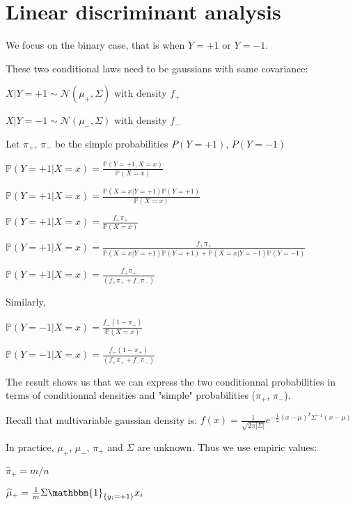 \section*{Linear discriminant analysis}

\vspace{5mm}

We focus on the binary case, that is when $Y=+1$ or $Y=-1$.

These two conditional laws need to be gaussians with same covariance: \vspace{1mm}

$X | Y=+1 \sim \mathcal{N}(\mu_+,\Sigma)$ with density $f_+$

$X | Y=-1 \sim \mathcal{N}(\mu_-,\Sigma)$ with density $f_-$

Let $\pi_+$, $\pi_-$ be the simple probabilities $P(Y=+1)$, $P(Y=-1)$\vspace{3mm}

$ \mathbb{P}(Y=+1|X=x) = \frac{\mathbb{P}(Y=+1, X=x)}{\mathbb{P}(X=x)}$

$ \mathbb{P}(Y=+1|X=x) = \frac{\mathbb{P}(X=x|Y=+1) \mathbb{P}(Y=+1) }{\mathbb{P}(X=x) }$

$ \mathbb{P}(Y=+1|X=x) = \frac{f_+ \pi_+}{\mathbb{P}(X=x) }$

$ \mathbb{P}(Y=+1|X=x) = \frac{f_+ \pi_+}{\mathbb{P}(X=x|Y=+1)\mathbb{P}(Y= +1) + \mathbb{P}(X=x|Y=-1)\mathbb{P}(Y= -1) }$

$\mathbb{P}(Y=+1|X=x) = \frac{f_+ \pi_+}{(f_+\pi_+ + f_-\pi_-)}$

Similarly,

$ \mathbb{P}(Y=-1|X=x) = \frac{f_- (1-\pi_+)}{\mathbb{P}(X=x) }$

$\mathbb{P}(Y=-1|X=x) = \frac{f_- (1-\pi_+)}{(f_+\pi_+ + f_-\pi_-)}$

\vspace{3mm}

The result shows us that we can express the two conditionnal probabilities in terms of conditionnal densities and "simple" probabilities ($\pi_+$, $\pi_-$).

Recall that multivariable gaussian density is: $f(x)=\frac{1}{\sqrt{2 \pi |\Sigma|}}e^{-\frac{1}{2}(x-\mu)^T\Sigma^{-1}(x-\mu)}$

In practice, $\mu_+$, $\mu_-$, $\pi_+$ and $\Sigma$ are unknown. Thus we use empiric values:

$\widehat{\pi}_+ = m/n$

$\widehat{\mu}_+ = \frac{1}{m} \Sigma \mathbbm{1}_{\{y_i=+1\}}x_i$


